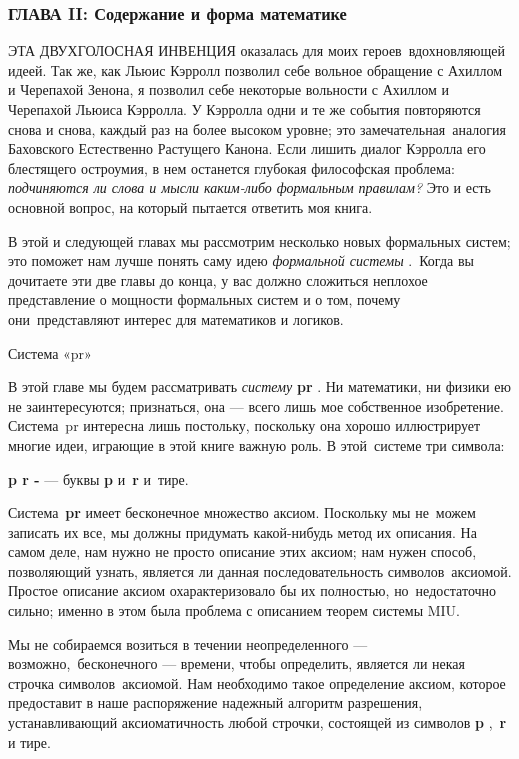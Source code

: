\subsubsection{ГЛАВА II: Содержание и форма  математике}

ЭТА ДВУХГОЛОСНАЯ ИНВЕНЦИЯ оказалась для моих героев~вдохновляющей идеей. Так же, как Льюис Кэрролл позволил себе вольное обращение с Ахиллом и Черепахой Зенона, я позволил себе некоторые вольности с Ахиллом и Черепахой Льюиса Кэрролла. У Кэрролла одни и те же события повторяются снова и снова, каждый раз на более высоком уровне; это замечательная~аналогия Баховского Естественно Растущего Канона. Если лишить диалог Кэрролла его блестящего остроумия, в нем останется глубокая философская проблема: \emph{подчиняются ли слова и мысли каким-либо формальным правилам?} Это и есть основной вопрос, на который пытается ответить моя книга.

В этой и следующей главах мы рассмотрим несколько новых формальных систем; это поможет нам лучше понять саму идею \emph{формальной системы} .~Когда вы дочитаете эти две главы до конца, у вас должно сложиться неплохое представление о мощности формальных систем и о том, почему они~представляют интерес для математиков и логиков.

Система «pr»

В этой главе мы будем рассматривать \emph{систему} \textbf{pr} . Ни математики, ни физики ею не заинтересуются; признаться, она --- всего лишь мое собственное изобретение. Система~pr интересна лишь постольку, поскольку она хорошо иллюстрирует многие идеи, играющие в этой книге важную роль. В этой~системе три символа:

\textbf{p r -} --- буквы \textbf{p} и~\textbf{r} и~тире.

Система~\textbf{pr} имеет бесконечное множество аксиом. Поскольку мы не~можем записать их все, мы должны придумать какой-нибудь метод их описания. На самом деле, нам нужно не просто описание этих аксиом; нам нужен способ, позволяющий узнать, является ли данная последовательность символов~аксиомой. Простое описание аксиом охарактеризовало бы их полностью, но~недостаточно сильно; именно в этом была проблема с описанием теорем системы MIU.

Мы не собираемся возиться в течении неопределенного --- возможно,~бесконечного --- времени, чтобы определить, является ли некая строчка символов~аксиомой. Нам необходимо такое определение аксиом, которое предоставит в наше распоряжение надежный алгоритм разрешения, устанавливающий аксиоматичность любой строчки, состоящей из символов \textbf{p} ,~\textbf{r} и тире.

